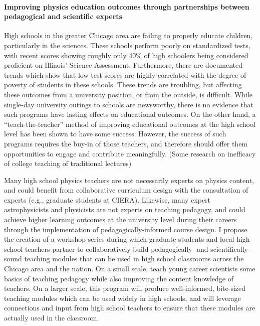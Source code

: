 \documentclass[11pt, preprint]{aastex}
\begin{document}
\paragraph{Improving physics education outcomes through partnerships between pedagogical and scientific experts}
High schools in the greater Chicago area are failing to properly educate children, particularly in the sciences.
These schools perform poorly on standardized tests, with recent scores showing roughly only 40\% of high schoolers being considered proficient on Illinois' Science Assessment.
Furthermore, there are documented trends which show that low test scores are highly correlated with the degree of poverty of students in these schools.
These trends are troubling, but affecting these outcomes from a university position, or from the outside, is difficult.
While single-day university outings to schools are newsworthy, there is no evidence that such programs have lasting effects on educational outcomes.
On the other hand, a ``teach-the-teacher'' method of improving educational outcomes at the high school level has been shown to have some success.
However, the success of such programs requires the buy-in of those teachers, and therefore should offer them opportunities to engage and contribute meaningfully.
(Some research on inefficacy of college teaching of traditional lectures)

Many high school physics teachers are not necessarily experts on physics content, and could benefit from collaborative curriculum design with the consultation of experts (e.g., graduate students at CIERA).
Likewise, many expert astrophysicists and physicists are not experts on teaching pedagogy, and could achieve higher learning outcomes at the university level during their careers through the implementation of pedagogically-informed course design.
I propose the creation of a workshop series during which graduate students and local high school teachers partner to collaboratively build pedagogically- and scientifically- sound teaching modules that can be used in high school classrooms across the Chicago area and the nation.
On a small scale, teach young career scientists some basics of teaching pedagogy while also improving the content knowledge of teachers.
On a larger scale, this program will produce well-informed, bite-sized teaching modules which can be used widely in high schools, and will leverage connections and input from high school teachers to ensure that these modules are actually used in the classroom.
\end{document}
